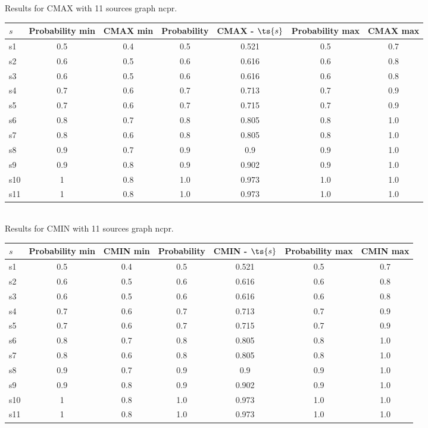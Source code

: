 \documentclass{article}
\begin{document}
\noindent Results for CMAX with 11 sources graph ncpr.

\noindent\begin{tabular}{|l|c|c|c|c|c|c|}
\hline
$s$& Probability min & CMAX min & Probability & CMAX - $\ts{s}$ & Probability max & CMAX max\\
\hline
s1 &0.5 & 0.4 & 0.5 & 0.521 & 0.5 & 0.7\\
\hline
s2 &0.6 & 0.5 & 0.6 & 0.616 & 0.6 & 0.8\\
\hline
s3 &0.6 & 0.5 & 0.6 & 0.616 & 0.6 & 0.8\\
\hline
s4 &0.7 & 0.6 & 0.7 & 0.713 & 0.7 & 0.9\\
\hline
s5 &0.7 & 0.6 & 0.7 & 0.715 & 0.7 & 0.9\\
\hline
s6 &0.8 & 0.7 & 0.8 & 0.805 & 0.8 & 1.0\\
\hline
s7 &0.8 & 0.6 & 0.8 & 0.805 & 0.8 & 1.0\\
\hline
s8 &0.9 & 0.7 & 0.9 & 0.9 & 0.9 & 1.0\\
\hline
s9 &0.9 & 0.8 & 0.9 & 0.902 & 0.9 & 1.0\\
\hline
s10 &1 & 0.8 & 1.0 & 0.973 & 1.0 & 1.0\\
\hline
s11 &1 & 0.8 & 1.0 & 0.973 & 1.0 & 1.0\\
\hline
\end{tabular}\\

\noindent Results for CMIN with 11 sources graph ncpr.

\noindent\begin{tabular}{|l|c|c|c|c|c|c|}
\hline
$s$& Probability min & CMIN min & Probability & CMIN - $\ts{s}$ & Probability max & CMIN max\\
\hline
s1 &0.5 & 0.4 & 0.5 & 0.521 & 0.5 & 0.7\\
\hline
s2 &0.6 & 0.5 & 0.6 & 0.616 & 0.6 & 0.8\\
\hline
s3 &0.6 & 0.5 & 0.6 & 0.616 & 0.6 & 0.8\\
\hline
s4 &0.7 & 0.6 & 0.7 & 0.713 & 0.7 & 0.9\\
\hline
s5 &0.7 & 0.6 & 0.7 & 0.715 & 0.7 & 0.9\\
\hline
s6 &0.8 & 0.7 & 0.8 & 0.805 & 0.8 & 1.0\\
\hline
s7 &0.8 & 0.6 & 0.8 & 0.805 & 0.8 & 1.0\\
\hline
s8 &0.9 & 0.7 & 0.9 & 0.9 & 0.9 & 1.0\\
\hline
s9 &0.9 & 0.8 & 0.9 & 0.902 & 0.9 & 1.0\\
\hline
s10 &1 & 0.8 & 1.0 & 0.973 & 1.0 & 1.0\\
\hline
s11 &1 & 0.8 & 1.0 & 0.973 & 1.0 & 1.0\\
\hline
\end{tabular}\\
\end{document}
